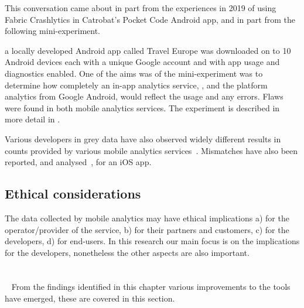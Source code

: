 This conversation came about in part from the experiences in 2019 of using Fabric Crashlytics in Catrobat's Pocket Code Android app, and in part from the following mini-experiment. 

a locally developed Android app called Travel Europe was downloaded on to 10 Android devices each with a unique Google account and with app usage and diagnostics enabled. One of the aims was of the mini-experiment was to determine how completely an in-app analytics service, , and the platform analytics from Google Android, would reflect the usage and any errors. Flaws were found in both mobile analytics services. The experiment is described in more detail in .

Various developers in grey data have also observed widely different results in counts provided by various mobile analytics services~. Mismatches have also been reported, and analysed~, for an iOS app. %


\subsection{Ethical considerations} 
The data collected by mobile analytics may have ethical implications a) for the operator/provider of the service, b) for their partners and customers, c) for the developers, d) for end-users. In this research our main focus is on the implications for the developers, nonetheless the other aspects are also important.

\section{\itools}~\label{tata-itools-section}
From the findings identified in this chapter various improvements to the tools have emerged, these are covered in this section.

